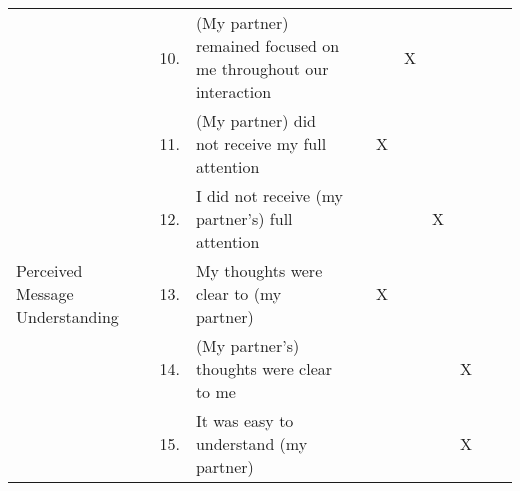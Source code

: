 \begin{table}[h]
\begin{tabular}{@{}lcl|ccccccc@{}}
                                     & 10.      & (My partner) remained focused on me throughout our interaction             &                                                              &          & X                                                            &         &                                                           &       &                                                           \\
                                     & 11.      & (My partner) did not receive my full attention                             &                                                              & X        &                                                              &         &                                                           &       &                                                           \\
                                     & 12.      & I did not receive (my partner's) full attention                            &                                                              &          &                                                              & X       &                                                           &       &                                                           \\ \midrule
Perceived Message Understanding      & 13.      & My thoughts were clear to (my partner)                                     &                                                              & X        &                                                              &         &                                                           &       &                                                           \\
                                     & 14.      & (My partner's) thoughts were clear to me                                   &                                                              &          &                                                              &         & X                                                         &       &                                                           \\
                                     & 15.      & It was easy to understand (my partner)                                     &                                                              &          &                                                              &         & X                                                         &       &                                                           \\

\end{tabular}
\end{table}
